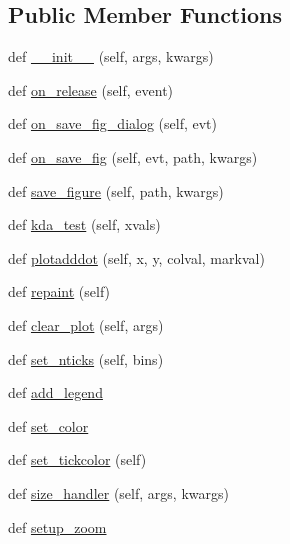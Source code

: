 \subsection*{Public Member Functions}
\begin{DoxyCompactItemize}
\item 
def \hyperlink{class_uni_dec_1_1unidec__modules_1_1_plotting_window_1_1_plotting_window_a069041d1fdaf8d1c2015295218703a3c}{\+\_\+\+\_\+init\+\_\+\+\_\+} (self, args, kwargs)
\item 
def \hyperlink{class_uni_dec_1_1unidec__modules_1_1_plotting_window_1_1_plotting_window_a489b9099201ad5e4f8b0e5d19fa1cc31}{on\+\_\+release} (self, event)
\item 
def \hyperlink{class_uni_dec_1_1unidec__modules_1_1_plotting_window_1_1_plotting_window_a56c3f25dbe279e28ae984371b8dfa6d5}{on\+\_\+save\+\_\+fig\+\_\+dialog} (self, evt)
\item 
def \hyperlink{class_uni_dec_1_1unidec__modules_1_1_plotting_window_1_1_plotting_window_afe59df54074c374bcef0dabeafb3dbc1}{on\+\_\+save\+\_\+fig} (self, evt, path, kwargs)
\item 
def \hyperlink{class_uni_dec_1_1unidec__modules_1_1_plotting_window_1_1_plotting_window_a86189b26c84844d7501a6c539d58d342}{save\+\_\+figure} (self, path, kwargs)
\item 
def \hyperlink{class_uni_dec_1_1unidec__modules_1_1_plotting_window_1_1_plotting_window_a2571bb41ad9653cb55b15b9526a524a8}{kda\+\_\+test} (self, xvals)
\item 
def \hyperlink{class_uni_dec_1_1unidec__modules_1_1_plotting_window_1_1_plotting_window_a5d274f42550cadba8e455814aaf36da7}{plotadddot} (self, x, y, colval, markval)
\item 
def \hyperlink{class_uni_dec_1_1unidec__modules_1_1_plotting_window_1_1_plotting_window_a88e88ed6a5e5bc48d45eb6f3e03abb64}{repaint} (self)
\item 
def \hyperlink{class_uni_dec_1_1unidec__modules_1_1_plotting_window_1_1_plotting_window_a0bb4e4db8b8c443eceba5f4396517885}{clear\+\_\+plot} (self, args)
\item 
def \hyperlink{class_uni_dec_1_1unidec__modules_1_1_plotting_window_1_1_plotting_window_ac5d4325e42d5623c5e9149532fac58fa}{set\+\_\+nticks} (self, bins)
\item 
def \hyperlink{class_uni_dec_1_1unidec__modules_1_1_plotting_window_1_1_plotting_window_ada6169d35911aecc748d86ed13f07e49}{add\+\_\+legend}
\item 
def \hyperlink{class_uni_dec_1_1unidec__modules_1_1_plotting_window_1_1_plotting_window_a2fd1d7778aa78d24f7fd57e0738a4992}{set\+\_\+color}
\item 
def \hyperlink{class_uni_dec_1_1unidec__modules_1_1_plotting_window_1_1_plotting_window_a6336e1542edeafeef1b2728066560140}{set\+\_\+tickcolor} (self)
\item 
def \hyperlink{class_uni_dec_1_1unidec__modules_1_1_plotting_window_1_1_plotting_window_af6f9629a25afdf1e33eb5ff3d4bc3cdf}{size\+\_\+handler} (self, args, kwargs)
\item 
def \hyperlink{class_uni_dec_1_1unidec__modules_1_1_plotting_window_1_1_plotting_window_a6a42c2d68210567e7afbd4110577f7b8}{setup\+\_\+zoom}
\end{DoxyCompactItemize}
